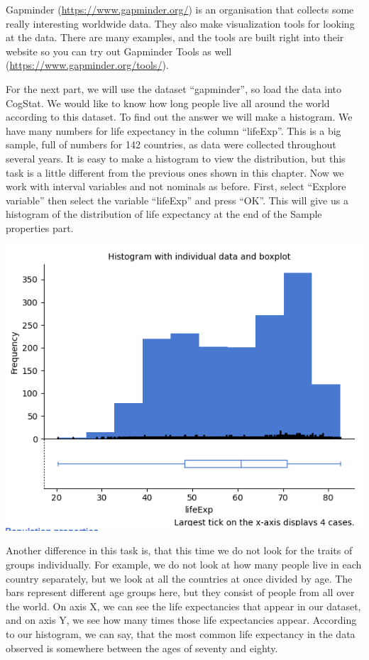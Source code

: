 \documentclass[
]{book}
\begin{document}
Gapminder (\url{https://www.gapminder.org/}) is an organisation that collects some really interesting worldwide data. They also make visualization tools for looking at the data. There are many examples, and the tools are built right into their website so you can try out Gapminder Tools as well (\url{https://www.gapminder.org/tools/}).

For the next part, we will use the dataset ``gapminder'', so load the data into CogStat. We would like to know how long people live all around the world according to this dataset. To find out the answer we will make a histogram. We have many numbers for life expectancy in the column ``lifeExp''. This is a big sample, full of numbers for 142 countries, as data were collected throughout several years. It is easy to make a histogram to view the distribution, but this task is a little different from the previous ones shown in this chapter. Now we work with interval variables and not nominals as before. First, select ``Explore variable'' then select the variable ``lifeExp'' and press ``OK''. This will give us a histogram of the distribution of life expectancy at the end of the Sample properties part.

\includegraphics{img/ch1/lieexhisto.png}

Another difference in this task is, that this time we do not look for the traits of groups individually. For example, we do not look at how many people live in each country separately, but we look at all the countries at once divided by age. The bars represent different age groups here, but they consist of people from all over the world. On axis X, we can see the life expectancies that appear in our dataset, and on axis Y, we see how many times those life expectancies appear. According to our histogram, we can say, that the most common life expectancy in the data observed is somewhere between the ages of seventy and eighty.
\end{document}
